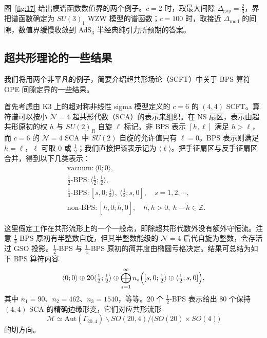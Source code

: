 图~\ref{fig:17} 给出模谱函数数值界的两个例子。$c=2$ 时，取最大间隙 $\Delta_{\mathrm{gap}}=\frac23$，界把谱函数确定为 $SU(3)_1$ WZW 模型的谱函数；$c=100$ 时，取接近 $\Delta_{\mathrm{mod}}$ 的间隙，数值界缓慢收敛到 AdS$_3$ 半经典纯引力所预期的答案。


\subsection{超共形理论的一些结果}\label{sec:5-3}

我们将用两个非平凡的例子，简要介绍超共形场论（SCFT）中关于 BPS 算符 OPE 间隙定界的一些结果。

首先考虑由 K3 上的超对称非线性 sigma 模型定义的 $c=6$ 的 $(4,4)$ SCFT。算符谱可以按小 $\mathcal{N}=4$ 超共形代数（SCA）的表示来组织。在 NS 扇区，表示由超共形原初的权 $h$ 与 $SU(2)_R$ 自旋 $\ell$ 标记。非 BPS 表示 $[h,\ell]$ 满足 $h>\ell$，而 $c=6$ 的 $\mathcal{N}=4$ SCA 中 $SU(2)$ 自旋的允许值只有 $\ell=0$。BPS 表示则满足 $h=\ell$，$\ell$ 可取 $0$ 或 $\frac12$；我们直接把该表示记为 $\langle\ell\rangle$。把手征扇区与反手征扇区合并，得到以下几类表示：
\begin{equation}
  \label{eq:5-25}
  \begin{aligned}
    &\text{vacuum}: \langle 0;0\rangle,\\
    &\tfrac12\text{-BPS}: \langle \tfrac12;\tfrac12\rangle,\\
    &\tfrac14\text{-BPS}: [s,0;\tfrac12\rangle,\
      \langle \tfrac12;s,0],\quad s=1,2,\cdots,\\
    &\text{non-BPS}: [h,0;\tilde h,0],\quad
      h,\tilde h>0,\ h-\tilde h\in\mathbb{Z}.
  \end{aligned}
\end{equation}

这里假定工作在共形流形上的一个一般点，即除超共形代数外没有额外守恒流。注意 $\frac14$-BPS 原初有半整数自旋，但其半整数能级的 $\mathcal{N}=4$ 后代自旋为整数，会存活过 GSO 投影。$\frac12$-BPS 与 $\frac14$-BPS 原初的简并度由椭圆亏格决定。结果可总结为如下 BPS 算符内容
\begin{equation}
  \label{eq:5-26}
  \langle 0;0\rangle\oplus 20\langle\tfrac12;\tfrac12\rangle
  \oplus\bigoplus_{s=1}^{\infty} n_s
  \Bigl([s,0;\tfrac12\rangle\oplus\langle\tfrac12;s,0]\Bigr),
\end{equation}
其中 $n_1=90$、$n_2=462$、$n_3=1540$，等等。$20$ 个 $\frac12$-BPS 表示给出 $80$ 个保持 $(4,4)$ SCA 的精确边缘形变，它们对应共形流形
\[
  \mathcal{M}\simeq
  \mathrm{Aut}(\Gamma_{20,4})\backslash SO(20,4)/
  \bigl(SO(20)\times SO(4)\bigr)
\]
的切方向。

